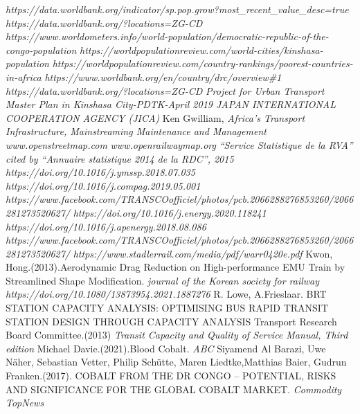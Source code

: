 \documentclass{article}
\begin{document}
\begin{thebibliography}{99}
\textit{https://data.worldbank.org/indicator/sp.pop.grow?most\_recent\_value\_desc=true}
\textit{https://data.worldbank.org/?locations=ZG-CD}
\textit{https://www.worldometers.info/world-population/democratic-republic-of-the-congo-population}
\textit{https://worldpopulationreview.com/world-cities/kinshasa-population}
\textit{https://worldpopulationreview.com/country-rankings/poorest-countries-in-africa}
\textit{https://www.worldbank.org/en/country/drc/overview\#1}
\textit{ https://data.worldbank.org/?locations=ZG-CD}
\textit{Project for Urban Transport Master Plan in Kinshasa City-PDTK-April 2019
JAPAN INTERNATIONAL COOPERATION AGENCY (JICA)}
Ken Gwilliam, \textit{Africa’s Transport Infrastructure, Mainstreaming Maintenance and Management}
\textit{www.openstreetmap.com}
\textit{www.openrailwaymap.org}
\textit{“Service Statistique de la RVA” cited by “Annuaire statistique 2014 de la RDC”, 2015}
\textit{https://doi.org/10.1016/j.ymssp.2018.07.035}
\textit{https://doi.org/10.1016/j.compag.2019.05.001}
\textit{https://www.facebook.com/TRANSCOofficiel/photos/pcb.2066288276853260/2066281273520627/}
\textit{https://doi.org/10.1016/j.energy.2020.118241}
\textit{https://doi.org/10.1016/j.apenergy.2018.08.086}
\textit{https://www.facebook.com/TRANSCOofficiel/photos/pcb.2066288276853260/2066281273520627/}
\textit{https://www.stadlerrail.com/media/pdf/warr0420e.pdf}
Kwon, Hong.(2013).Aerodynamic Drag Reduction on High-performance EMU Train by Streamlined Shape Modification.
\textit{journal of the Korean society for railway}
\textit{https://doi.org/10.1080/13873954.2021.1887276}
R. Lowe, A.Frieslaar. BRT STATION CAPACITY ANALYSIS: OPTIMISING BUS RAPID TRANSIT STATION DESIGN THROUGH CAPACITY ANALYSIS
Transport Research Board Committee.(2013) \textit{Transit Capacity and Quality of Service Manual, Third edition}
Michael Davie.(2021).Blood Cobalt. \textit{ABC}
Siyamend Al Barazi, Uwe Näher, Sebastian Vetter, Philip Schütte, Maren Liedtke,Matthias Baier, Gudrun Franken.(2017).
COBALT FROM THE DR CONGO – POTENTIAL, RISKS AND SIGNIFICANCE FOR THE GLOBAL COBALT MARKET. \textit{Commodity TopNews}

\end{thebibliography}
\end{document}
